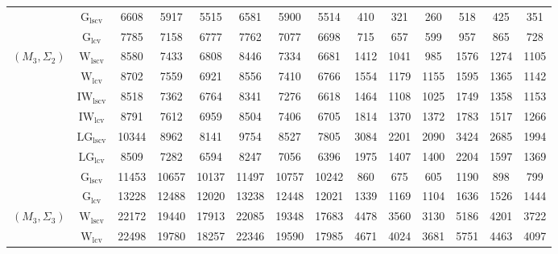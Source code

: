 \begin{table}[!ht]
{\begin{tabular}{@{}cc|ccc|ccc|ccc|ccc@{}}
 & $\mathrm{G}_{\mathrm{lscv}}$ & 6608 & 5917 & 5515 & 6581 & 5900 & 5514 & \cellcolor{black!30}410 & \cellcolor{black!30}321 & \cellcolor{black!30}260 & \cellcolor{black!30}518 & \cellcolor{black!30}425 & \cellcolor{black!30}351 \\ 
 & $\mathrm{G}_{\mathrm{lcv}}$ & 7785 & 7158 & 6777 & 7762 & 7077 & 6698 & \cellcolor{black!10}715 & \cellcolor{black!10}657 & 599 & \cellcolor{black!10}957 & 865 & 728 \\ 
\midrule
$(M_3,\Sigma_2)$ & $\mathrm{W}_{\mathrm{lscv}}$ & 8580 & 7433 & 6808 & 8446 & 7334 & 6681 & 1412 & \cellcolor{black!10}1041 & \cellcolor{black!10}985 & \cellcolor{black!10}1576 & \cellcolor{black!10}1274 & \cellcolor{black!10}1105 \\ 
 & $\mathrm{W}_{\mathrm{lcv}}$ & 8702 & 7559 & 6921 & 8556 & 7410 & 6766 & 1554 & 1179 & 1155 & 1595 & 1365 & 1142 \\ 
 & $\mathrm{IW}_{\mathrm{lscv}}$ & \cellcolor{black!10}8518 & \cellcolor{black!10}7362 & \cellcolor{black!10}6764 & \cellcolor{black!10}8341 & \cellcolor{black!10}7276 & \cellcolor{black!10}6618 & 1464 & 1108 & 1025 & 1749 & 1358 & 1153 \\ 
 & $\mathrm{IW}_{\mathrm{lcv}}$ & 8791 & 7612 & 6959 & 8504 & 7406 & 6705 & 1814 & 1370 & 1372 & 1783 & 1517 & 1266 \\ 
 & $\mathrm{LG}_{\mathrm{lscv}}$ & 10344 & 8962 & 8141 & 9754 & 8527 & 7805 & 3084 & 2201 & 2090 & 3424 & 2685 & 1994 \\ 
 & $\mathrm{LG}_{\mathrm{lcv}}$ & \cellcolor{black!30}8509 & \cellcolor{black!30}7282 & \cellcolor{black!30}6594 & \cellcolor{black!30}8247 & \cellcolor{black!30}7056 & \cellcolor{black!30}6396 & 1975 & 1407 & 1400 & 2204 & 1597 & 1369 \\ 
 & $\mathrm{G}_{\mathrm{lscv}}$ & 11453 & 10657 & 10137 & 11497 & 10757 & 10242 & \cellcolor{black!30}860 & \cellcolor{black!30}675 & \cellcolor{black!30}605 & \cellcolor{black!30}1190 & \cellcolor{black!30}898 & \cellcolor{black!30}799 \\ 
 & $\mathrm{G}_{\mathrm{lcv}}$ & 13228 & 12488 & 12020 & 13238 & 12448 & 12021 & \cellcolor{black!10}1339 & 1169 & 1104 & 1636 & 1526 & 1444 \\ 
\midrule
$(M_3,\Sigma_3)$ & $\mathrm{W}_{\mathrm{lscv}}$ & 22172 & 19440 & 17913 & 22085 & 19348 & 17683 & \cellcolor{black!30}4478 & \cellcolor{black!30}3560 & \cellcolor{black!30}3130 & \cellcolor{black!30}5186 & \cellcolor{black!10}4201 & 3722 \\ 
 & $\mathrm{W}_{\mathrm{lcv}}$ & 22498 & 19780 & 18257 & 22346 & 19590 & 17985 & \cellcolor{black!10}4671 & \cellcolor{black!10}4024 & \cellcolor{black!10}3681 & \cellcolor{black!10}5751 & 4463 & 4097 \\ 

\end{tabular}}
\end{table}
